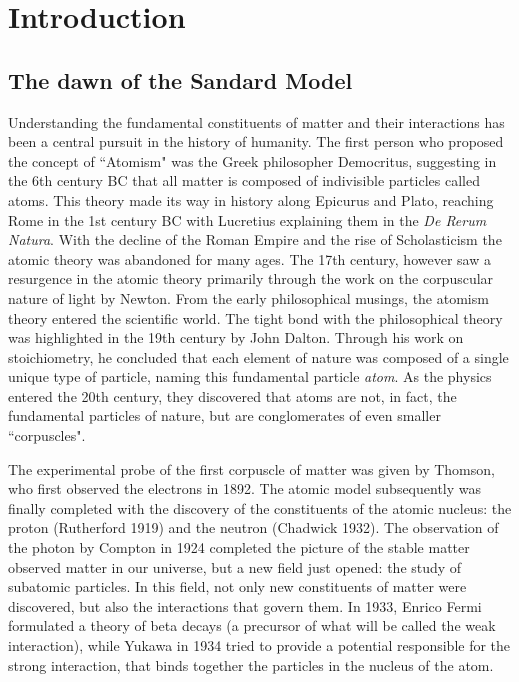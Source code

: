 \renewcommand{\chaptermark}[1]{\markboth{#1}{}}
\renewcommand{\sectionmark}[1]{\markright{#1}}
\fancyhead{} %
\fancyhead[LE]{\chaptername~\thechapter | \leftmark}
\fancyhead[RO]{\thesection~\rightmark}
\fancyfoot{} %
\fancyfoot[LE,RO]{\thepage}

    
\chapter{Introduction}
\label{chp:intro}
\section{The dawn of the Sandard Model}
Understanding the fundamental constituents of matter and their interactions has been a central pursuit in the history of humanity. The first person who proposed the concept of ``Atomism" was the Greek philosopher Democritus, suggesting in the 6th century BC that all matter is composed of indivisible particles called atoms\cite{laertius1853lives}. 
This theory made its way in history along Epicurus and Plato, reaching Rome in the 1st century BC with Lucretius explaining them in the \textit{De Rerum Natura}. With the decline of the Roman Empire and the rise of Scholasticism the atomic theory was abandoned for many ages. The 17th century, however saw a resurgence in the atomic theory primarily through the work on the corpuscular nature of light by Newton. From the early philosophical musings, the atomism theory entered the scientific world. The tight bond with the philosophical theory was highlighted in the 19th century by John Dalton. Through his work on stoichiometry, he concluded that each element of nature was composed of a single unique type of particle, naming this fundamental particle \textit{atom}. As the physics entered the 20th century, they discovered that atoms are not, in fact, the fundamental particles of nature, but are conglomerates of even smaller ``corpuscles".

The experimental probe of the first corpuscle of matter was given by Thomson, who first observed the electrons in 1892. The atomic model subsequently was finally completed with the discovery of the constituents of the atomic nucleus: the proton (Rutherford 1919) and the neutron (Chadwick 1932). The observation of the photon by Compton in 1924 completed the picture of the stable matter observed matter in our universe, but a new field just opened: the study of subatomic particles. In this field, not only new constituents of matter were discovered, but also the interactions that govern them. In 1933, Enrico Fermi formulated a theory of beta decays (a precursor of what will be called the weak interaction), while Yukawa in 1934 tried to provide a potential responsible for the strong interaction, that binds together the particles in the nucleus of the atom. 

